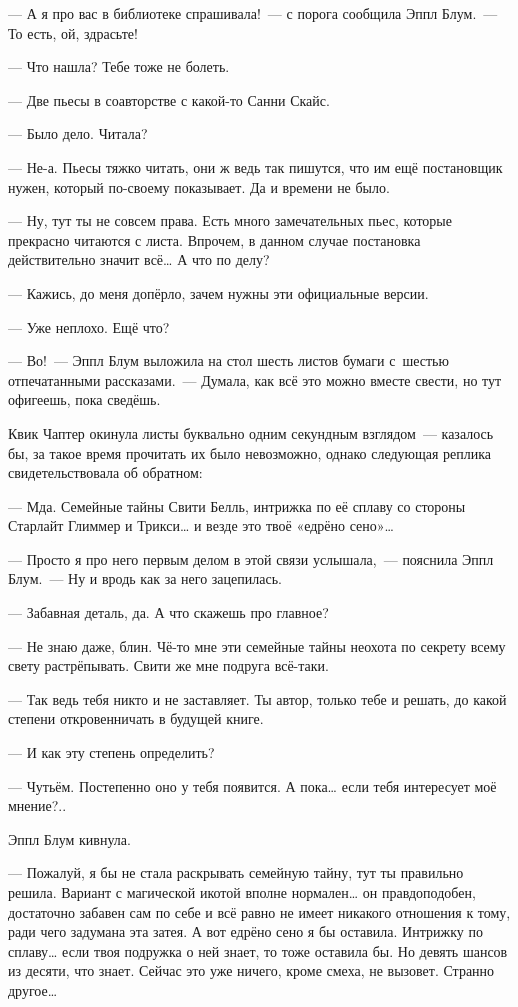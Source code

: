 \documentclass[fontsize=11pt,a5paper,titlepage=firstcover]{scrbook}
\begin{document}
--- А я про вас в библиотеке спрашивала!~--- с порога сообщила Эппл Блум.~--- То есть, ой, здрасьте!

--- Что нашла? Тебе тоже не болеть.

--- Две пьесы в соавторстве с какой-то Санни Скайс.

--- Было дело. Читала?

--- Не-а. Пьесы тяжко читать, они ж ведь так пишутся, что им ещё постановщик нужен, который по-своему показывает. Да и времени не было.

--- Ну, тут ты не совсем права. Есть много замечательных пьес, которые прекрасно читаются с листа. Впрочем, в данном случае постановка действительно значит всё{\ldots} А что по делу?

--- Кажись, до меня допёрло, зачем нужны эти официальные версии.

--- Уже неплохо. Ещё что?

--- Во!~--- Эппл Блум выложила на стол шесть листов бумаги с~шестью отпечатанными рассказами.~--- Думала, как всё это можно вместе свести, но тут офигеешь, пока сведёшь.

Квик Чаптер окинула листы буквально одним секундным взглядом~--- казалось бы, за такое время прочитать их было невозможно, однако следующая реплика свидетельствовала об обратном:

--- Мда. Семейные тайны Свити Белль, интрижка по её сплаву со стороны Старлайт Глиммер и Трикси{\ldots} и везде это твоё «едрёно сено»{\ldots}

--- Просто я про него первым делом в этой связи услышала,~--- пояснила Эппл Блум.~--- Ну и вродь как за него зацепилась.

--- Забавная деталь, да. А что скажешь про главное?

--- Не знаю даже, блин. Чё-то мне эти семейные тайны неохота по секрету всему свету растрёпывать. Свити же мне подруга всё-таки.

--- Так ведь тебя никто и не заставляет. Ты автор, только тебе и решать, до какой степени откровенничать в будущей книге.

--- И как эту степень определить?

--- Чутьём. Постепенно оно у тебя появится. А пока{\ldots} если тебя интересует моё мнение?..

Эппл Блум кивнула.

--- Пожалуй, я бы не стала раскрывать семейную тайну, тут ты правильно решила. Вариант с магической икотой вполне нормален{\ldots} он правдоподобен, достаточно забавен сам по себе и всё равно не имеет никакого отношения к тому, ради чего задумана эта затея. А вот едрёно сено я бы оставила. Интрижку по сплаву{\ldots} если твоя подружка о ней знает, то тоже оставила бы. Но девять шансов из десяти, что знает. Сейчас это уже ничего, кроме смеха, не вызовет. Странно другое{\ldots}
\end{document}
